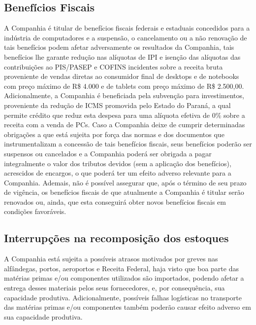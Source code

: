 \subsection{Benefícios Fiscais} A Companhia é titular de benefícios fiscais federais e estaduais concedidos para a indústria de computadores e a suspensão, o cancelamento ou a não renovação de tais benefícios podem afetar adversamente os resultados da Companhia, tais benefícios lhe garante redução nas alíquotas de IPI e isenção das alíquotas das contribuições ao PIS/PASEP e COFINS incidentes sobre a receita bruta proveniente de vendas diretas ao consumidor final de desktops e de notebooks com preço máximo de R\$ 4.000 e de tablets com preço máximo de R\$ 2.500,00.
Adicionalmente, a Companhia é beneficiada pela subvenção para investimentos, proveniente da redução de ICMS promovida pelo Estado do Paraná, a qual permite crédito que reduz esta despesa para uma alíquota efetiva de 0\% sobre a receita com a venda de PCs. Caso a Companhia deixe de cumprir determinadas obrigações a que está sujeita por força das normas e dos documentos que instrumentalizam a concessão de tais benefícios fiscais, seus benefícios poderão ser suspensos ou cancelados e a Companhia poderá ser obrigada a pagar integralmente o valor dos tributos devidos (sem a aplicação dos benefícios), acrescidos de encargos, o que poderá ter um efeito adverso relevante para a Companhia. Ademais, não é possível assegurar que, após o término de seu prazo de vigência, os benefícios fiscais de que atualmente a Companhia é titular serão renovados ou, ainda, que esta conseguirá obter novos benefícios fiscais em condições favoráveis. 

\subsection{Interrupções na recomposição dos estoques}
A Companhia está sujeita a possíveis atrasos motivados por greves nas alfândegas, portos, aeroportos e Receita Federal, haja visto que boa parte das matérias primas e/ou componentes utilizados são importados, podendo afetar a entrega desses materiais pelos seus fornecedores, e, por consequência, sua capacidade produtiva.
Adicionalmente, possíveis falhas logísticas no transporte das matérias primas e/ou componentes também poderão causar efeito adverso em sua capacidade produtiva.


